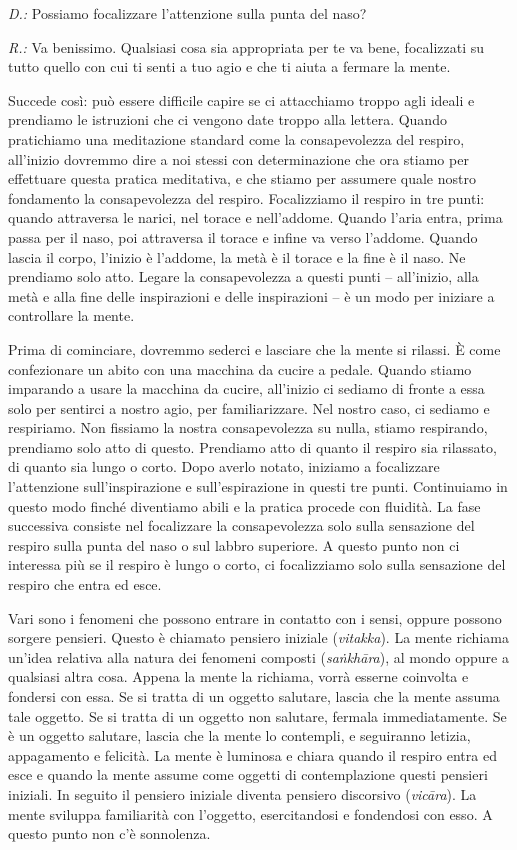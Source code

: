 \emph{D.:} Possiamo focalizzare l'attenzione sulla punta del naso?

\emph{R.:} Va benissimo. Qualsiasi cosa sia appropriata per te va bene,
focalizzati su tutto quello con cui ti senti a tuo agio e che ti aiuta a
fermare la mente.

Succede così: può essere difficile capire se ci attacchiamo troppo agli
ideali e prendiamo le istruzioni che ci vengono date troppo alla
lettera. Quando pratichiamo una meditazione standard come la
consapevolezza del respiro, all'inizio dovremmo dire a noi stessi con
determinazione che ora stiamo per effettuare questa pratica meditativa,
e che stiamo per assumere quale nostro fondamento la consapevolezza del
respiro. Focalizziamo il respiro in tre punti: quando attraversa le
narici, nel torace e nell'addome. Quando l'aria entra, prima passa per
il naso, poi attraversa il torace e infine va verso l'addome. Quando
lascia il corpo, l'inizio è l'addome, la metà è il torace e la fine è il
naso. Ne prendiamo solo atto. Legare la consapevolezza a questi punti --
all'inizio, alla metà e alla fine delle inspirazioni e delle
inspirazioni -- è un modo per iniziare a controllare la mente.

Prima di cominciare, dovremmo sederci e lasciare che la mente si
rilassi. È come confezionare un abito con una macchina da cucire a
pedale. Quando stiamo imparando a usare la macchina da cucire,
all'inizio ci sediamo di fronte a essa solo per sentirci a nostro agio,
per familiarizzare. Nel nostro caso, ci sediamo e respiriamo. Non
fissiamo la nostra consapevolezza su nulla, stiamo respirando, prendiamo
solo atto di questo. Prendiamo atto di quanto il respiro sia rilassato,
di quanto sia lungo o corto. Dopo averlo notato, iniziamo a focalizzare
l'attenzione sull'inspirazione e sull'espirazione in questi tre punti.
Continuiamo in questo modo finché diventiamo abili e la pratica procede
con fluidità. La fase successiva consiste nel focalizzare la
consapevolezza solo sulla sensazione del respiro sulla punta del naso o
sul labbro superiore. A questo punto non ci interessa più se il respiro
è lungo o corto, ci focalizziamo solo sulla sensazione del respiro che
entra ed esce.

Vari sono i fenomeni che possono entrare in contatto con i sensi, oppure
possono sorgere pensieri. Questo è chiamato pensiero iniziale
(\emph{vitakka}). La mente richiama un'idea relativa alla natura dei
fenomeni composti (\emph{saṅkhāra}), al mondo oppure a qualsiasi altra
cosa. Appena la mente la richiama, vorrà esserne coinvolta e fondersi
con essa. Se si tratta di un oggetto salutare, lascia che la mente
assuma tale oggetto. Se si tratta di un oggetto non salutare, fermala
immediatamente. Se è un oggetto salutare, lascia che la mente lo
contempli, e seguiranno letizia, appagamento e felicità. La mente è
luminosa e chiara quando il respiro entra ed esce e quando la mente
assume come oggetti di contemplazione questi pensieri iniziali. In
seguito il pensiero iniziale diventa pensiero discorsivo
(\emph{vicāra}). La mente sviluppa familiarità con l'oggetto,
esercitandosi e fondendosi con esso. A questo punto non c'è sonnolenza.

